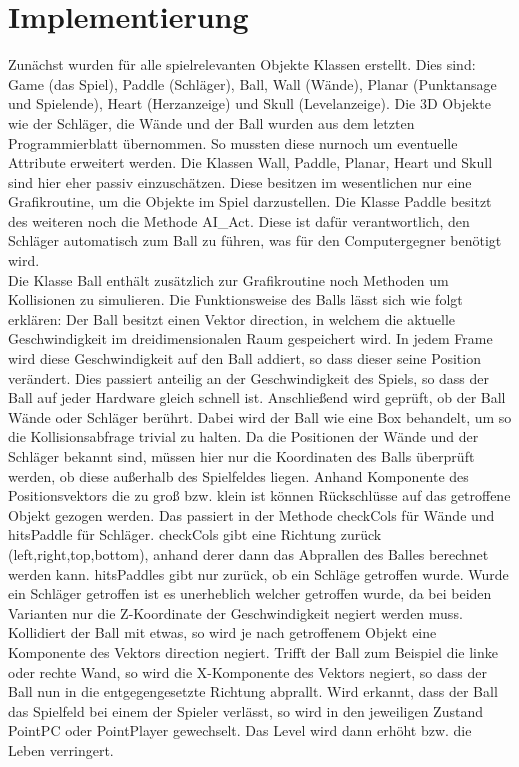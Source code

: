 \section{Implementierung}
Zunächst wurden für alle spielrelevanten Objekte Klassen erstellt. Dies sind: Game (das Spiel), Paddle (Schläger), Ball, Wall (Wände), Planar (Punktansage und Spielende), Heart (Herzanzeige) und Skull (Levelanzeige). Die 3D Objekte wie der Schläger, die Wände und der Ball wurden aus dem letzten Programmierblatt übernommen. So mussten diese nurnoch um eventuelle Attribute erweitert werden. Die Klassen Wall, Paddle, Planar, Heart und Skull sind hier eher passiv einzuschätzen. Diese besitzen im wesentlichen nur eine Grafikroutine, um die Objekte im Spiel darzustellen. Die Klasse Paddle besitzt des weiteren noch die Methode AI\_Act. Diese ist dafür verantwortlich, den Schläger automatisch zum Ball zu führen, was für den Computergegner benötigt wird.\\
Die Klasse Ball enthält zusätzlich zur Grafikroutine noch Methoden um Kollisionen zu simulieren. Die Funktionsweise des Balls lässt sich wie folgt erklären: Der Ball besitzt einen Vektor direction, in welchem die aktuelle Geschwindigkeit im dreidimensionalen Raum gespeichert wird. In jedem Frame wird diese Geschwindigkeit auf den Ball addiert, so dass dieser seine Position verändert. Dies passiert anteilig an der Geschwindigkeit des Spiels, so dass der Ball auf jeder Hardware gleich schnell ist. Anschließend wird geprüft, ob der Ball Wände oder Schläger berührt. Dabei wird der Ball wie eine Box behandelt, um so die Kollisionsabfrage trivial zu halten. Da die Positionen der Wände und der Schläger bekannt sind, müssen hier nur die Koordinaten des Balls überprüft werden, ob diese außerhalb des Spielfeldes liegen. Anhand Komponente des Positionsvektors die zu groß bzw. klein ist können Rückschlüsse auf das getroffene Objekt gezogen werden. Das passiert in der Methode checkCols für Wände und hitsPaddle für Schläger. checkCols gibt eine Richtung zurück (left,right,top,bottom), anhand derer dann das Abprallen des Balles berechnet werden kann. hitsPaddles gibt nur zurück, ob ein Schläge getroffen wurde. Wurde ein Schläger getroffen ist es unerheblich welcher getroffen wurde, da bei beiden Varianten nur die Z-Koordinate der Geschwindigkeit negiert werden muss. Kollidiert der Ball mit etwas, so wird je nach getroffenem Objekt eine Komponente des Vektors direction negiert. Trifft der Ball zum Beispiel die linke oder rechte Wand, so wird die X-Komponente des Vektors negiert, so dass der Ball nun in die entgegengesetzte Richtung abprallt. Wird erkannt, dass der Ball das Spielfeld bei einem der Spieler verlässt, so wird in den jeweiligen Zustand PointPC oder PointPlayer gewechselt. Das Level wird dann erhöht bzw. die Leben verringert.\\
